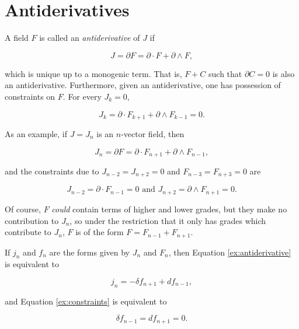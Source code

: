\documentclass{article}
\begin{document}
\section{Antiderivatives}

A field $F$ is called an \emph{antiderivative} of $J$ if

\begin{equation}
  J = \partial F = \partial \cdot F + \partial \wedge F,\label{eq:antiderivative}
\end{equation}

which is unique up to a monogenic term. That is, $F + C$ such that $\partial C = 0$ is also an antiderivative. Furthermore, given an antiderivative, one has possession of constraints on $F$. For every $J_k = 0$,

\begin{equation}
  J_k = \partial \cdot F_{k+1} + \partial \wedge F_{k-1} = 0.\label{eq:constraints}
\end{equation}

As an example, if $J = J_n$ is an $n$-vector field, then 

\begin{equation}
  J_n = \partial F = \partial \cdot F_{n+1} + \partial \wedge F_{n-1},\label{ex:antiderivative}
\end{equation}

and the constraints due to $J_{n-2} = J_{n+2} = 0$ and $F_{n-3} = F_{n+3} = 0$ are

\begin{equation}
  J_{n-2} = \partial \cdot F_{n-1} = 0 \text{ and } J_{n+2} = \partial \wedge F_{n+1} = 0.\label{ex:constraints}
\end{equation}

Of course, $F$ \emph{could} contain terms of higher and lower grades, but they make no contribution to $J_n$, so under the restriction that it only has grades which contribute to $J_n$, $F$ is of the form $F = F_{n-1} + F_{n+1}$.

If $j_n$ and $f_n$ are the forms given by $J_n$ and $F_n$, then Equation \ref{ex:antiderivative} is equivalent to

\begin{equation}
  j_n = -\delta f_{n+1} + d f_{n-1},
\end{equation}

and Equation \ref{ex:constraints} is equivalent to

\begin{equation}
  \delta f_{n-1} = d f_{n+1} = 0.
\end{equation}
\end{document}
